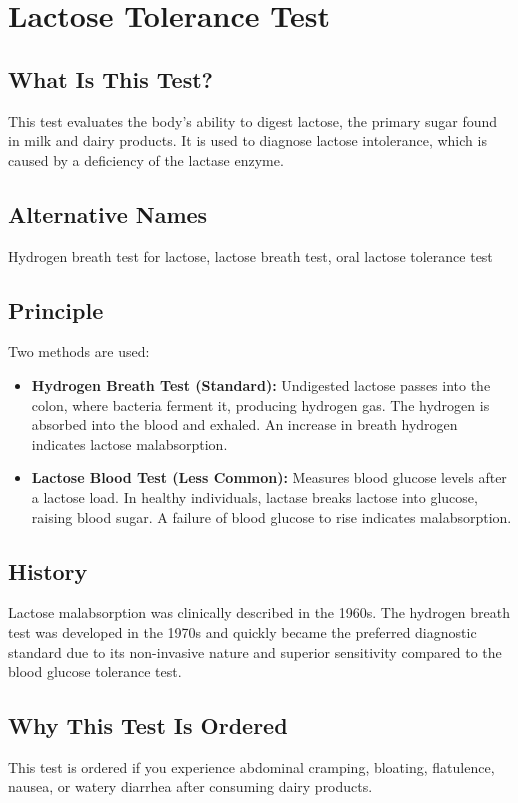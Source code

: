 \chapter{Lactose Tolerance Test}

\section*{What Is This Test?}
This test evaluates the body's ability to digest lactose, the primary sugar found in milk and dairy products. It is used to diagnose lactose intolerance, which is caused by a deficiency of the lactase enzyme.

\section*{Alternative Names}
Hydrogen breath test for lactose, lactose breath test, oral lactose tolerance test

\section*{Principle}
Two methods are used:
\begin{itemize}
    \item \textbf{Hydrogen Breath Test (Standard):} Undigested lactose passes into the colon, where bacteria ferment it, producing hydrogen gas. The hydrogen is absorbed into the blood and exhaled. An increase in breath hydrogen indicates lactose malabsorption.
    \item \textbf{Lactose Blood Test (Less Common):} Measures blood glucose levels after a lactose load. In healthy individuals, lactase breaks lactose into glucose, raising blood sugar. A failure of blood glucose to rise indicates malabsorption.
\end{itemize}

\section*{History}
Lactose malabsorption was clinically described in the 1960s. The hydrogen breath test was developed in the 1970s and quickly became the preferred diagnostic standard due to its non-invasive nature and superior sensitivity compared to the blood glucose tolerance test.

\section*{Why This Test Is Ordered}
This test is ordered if you experience abdominal cramping, bloating, flatulence, nausea, or watery diarrhea after consuming dairy products.


